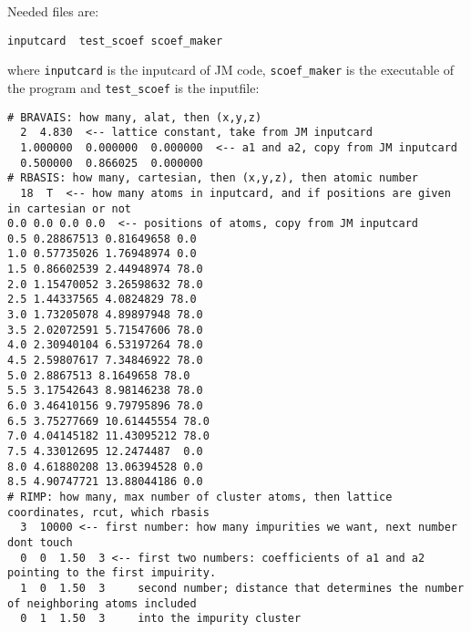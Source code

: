 \documentclass[a4paper,10pt,fullpage]{report}
\begin{document}
Needed files are:
\begin{verbatim}
inputcard  test_scoef scoef_maker      
\end{verbatim}
where \verb|inputcard| is the inputcard of JM code, \verb|scoef_maker| is the 
executable of the program and \verb|test_scoef| is the inputfile:

\begin{verbatim}
# BRAVAIS: how many, alat, then (x,y,z)
  2  4.830  <-- lattice constant, take from JM inputcard
  1.000000  0.000000  0.000000  <-- a1 and a2, copy from JM inputcard
  0.500000  0.866025  0.000000
# RBASIS: how many, cartesian, then (x,y,z), then atomic number
  18  T  <-- how many atoms in inputcard, and if positions are given in cartesian or not
0.0 0.0 0.0 0.0  <-- positions of atoms, copy from JM inputcard
0.5 0.28867513 0.81649658 0.0
1.0 0.57735026 1.76948974 0.0
1.5 0.86602539 2.44948974 78.0
2.0 1.15470052 3.26598632 78.0
2.5 1.44337565 4.0824829 78.0
3.0 1.73205078 4.89897948 78.0
3.5 2.02072591 5.71547606 78.0
4.0 2.30940104 6.53197264 78.0
4.5 2.59807617 7.34846922 78.0
5.0 2.8867513 8.1649658 78.0
5.5 3.17542643 8.98146238 78.0
6.0 3.46410156 9.79795896 78.0
6.5 3.75277669 10.61445554 78.0
7.0 4.04145182 11.43095212 78.0
7.5 4.33012695 12.2474487  0.0
8.0 4.61880208 13.06394528 0.0
8.5 4.90747721 13.88044186 0.0
# RIMP: how many, max number of cluster atoms, then lattice coordinates, rcut, which rbasis
  3  10000 <-- first number: how many impurities we want, next number dont touch
  0  0  1.50  3 <-- first two numbers: coefficients of a1 and a2 pointing to the first impuirity.
  1  0  1.50  3     second number; distance that determines the number of neighboring atoms included
  0  1  1.50  3     into the impurity cluster
\end{verbatim}
\end{document}
